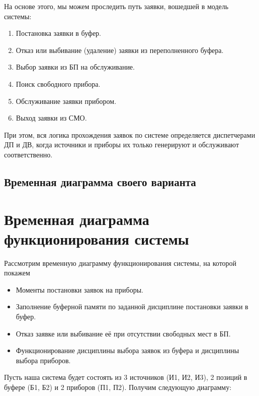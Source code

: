 \documentclass{article}
\begin{document}
	На основе этого, мы можем проследить путь заявки, вошедшей в модель системы:
	\begin{enumerate}
		\item Постановка заявки в буфер.
		\item Отказ или выбивание (удаление) заявки из переполненного буфера.
		\item Выбор заявки из БП на обслуживание.
		\item Поиск свободного прибора.
		\item Обслуживание заявки прибором.
		\item Выход заявки из СМО.
	\end{enumerate}
	При этом, вся логика прохождения заявок по системе определяется диспетчерами ДП и ДВ, когда источники и приборы их только генерируют и обслуживают соответственно.


	\subsection{Временная диаграмма своего варианта}
	\section{Временная диаграмма функционирования системы}
	Рассмотрим временную диаграмму функционирования системы, на которой покажем
	\begin{itemize}
		\item Моменты постановки заявок на приборы.
		\item Заполнение буферной памяти по заданной дисциплине постановки заявки в буфер.
		\item Отказ заявке или выбивание её при отсутствии свободных мест в БП.
		\item Функционирование дисциплины выбора заявок из буфера и дисциплины выбора приборов.
	\end{itemize}
	Пусть наша система будет состоять из 3 источников (И1, И2, И3), 2 позиций в буфере (Б1, Б2) и 2 приборов (П1, П2). Получим следующую диаграмму:
\end{document}
